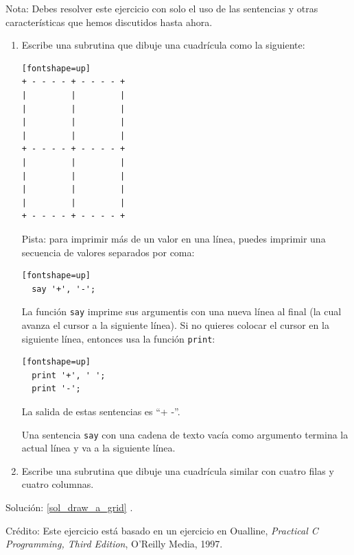 \begin{exercise}
\label{draw_a_grid}

Nota: Debes resolver este ejercicio con solo el uso de
las sentencias y otras características que hemos
discutidos hasta ahora.

\begin{enumerate}

\item Escribe una subrutina que dibuje una cuadrícula como 
la siguiente:

\begin{verbatim}[fontshape=up]
+ - - - - + - - - - +
|         |         |
|         |         |
|         |         |
|         |         |
+ - - - - + - - - - +
|         |         |
|         |         |
|         |         |
|         |         |
+ - - - - + - - - - +
\end{verbatim}
%
Pista: para imprimir más de un valor en una línea, puedes
imprimir una secuencia de valores separados por coma:

\begin{verbatim}[fontshape=up]
  say '+', '-';
\end{verbatim}
%
La función {\tt say} imprime sus argumentis con una nueva línea
al final (la cual avanza el cursor a la siguiente línea). Si no
quieres colocar el cursor en la siguiente línea, entonces usa
la función {\tt print}:

\begin{verbatim}[fontshape=up]
  print '+', ' ';
  print '-';
\end{verbatim}
%
La salida de estas sentencias es ``+ -''.

Una sentencia {\tt say} con una cadena de texto vacía como
argumento termina la actual línea y va a la siguiente
línea.

\item Escribe una subrutina que dibuje una cuadrícula similar con
cuatro filas y cuatro columnas.

\end{enumerate}

Solución: \ref{sol_draw_a_grid}
.

Crédito: Este ejercicio está basado en un ejercicio en Oualline, {\em
    Practical C Programming, Third Edition}, O'Reilly Media, 1997.

\end{exercise}

